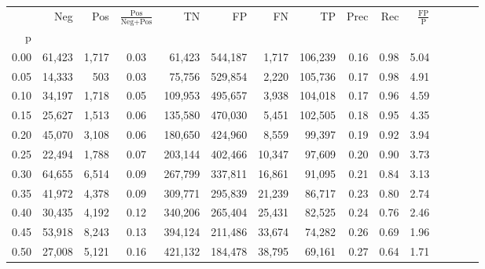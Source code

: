 \begin{tabular}{rrrcrrrrrrrrrrr}
\toprule
{} &     Neg &     Pos & $\frac{\text{Pos}}{\text{Neg}+\text{Pos}}$ &       TN &       FP &       FN &       TP &  Prec &   Rec & $\frac{\text{FP}}{\text{P}}$ \\
p    &         &         &                                            &          &          &          &          &       &       &                              \\
\midrule
0.00 &  61,423 &   1,717 &                                       0.03 &   61,423 &  544,187 &    1,717 &  106,239 &  0.16 &  0.98 &                         5.04 \\
0.05 &  14,333 &     503 &                                       0.03 &   75,756 &  529,854 &    2,220 &  105,736 &  0.17 &  0.98 &                         4.91 \\
0.10 &  34,197 &   1,718 &                                       0.05 &  109,953 &  495,657 &    3,938 &  104,018 &  0.17 &  0.96 &                         4.59 \\
0.15 &  25,627 &   1,513 &                                       0.06 &  135,580 &  470,030 &    5,451 &  102,505 &  0.18 &  0.95 &                         4.35 \\
0.20 &  45,070 &   3,108 &                                       0.06 &  180,650 &  424,960 &    8,559 &   99,397 &  0.19 &  0.92 &                         3.94 \\
0.25 &  22,494 &   1,788 &                                       0.07 &  203,144 &  402,466 &   10,347 &   97,609 &  0.20 &  0.90 &                         3.73 \\
0.30 &  64,655 &   6,514 &                                       0.09 &  267,799 &  337,811 &   16,861 &   91,095 &  0.21 &  0.84 &                         3.13 \\
0.35 &  41,972 &   4,378 &                                       0.09 &  309,771 &  295,839 &   21,239 &   86,717 &  0.23 &  0.80 &                         2.74 \\
0.40 &  30,435 &   4,192 &                                       0.12 &  340,206 &  265,404 &   25,431 &   82,525 &  0.24 &  0.76 &                         2.46 \\
0.45 &  53,918 &   8,243 &                                       0.13 &  394,124 &  211,486 &   33,674 &   74,282 &  0.26 &  0.69 &                         1.96 \\
0.50 &  27,008 &   5,121 &                                       0.16 &  421,132 &  184,478 &   38,795 &   69,161 &  0.27 &  0.64 &                         1.71 \\

\end{tabular}
